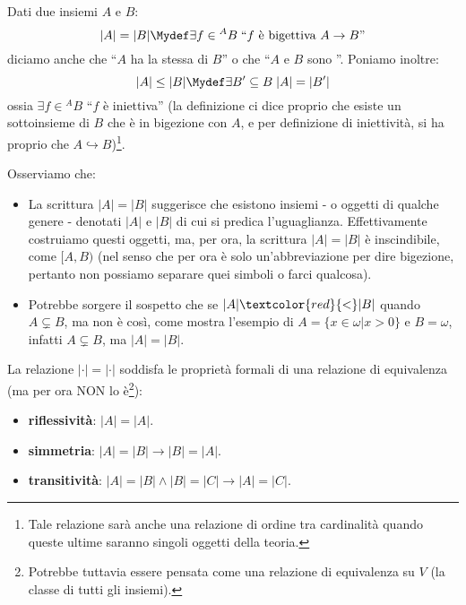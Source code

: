\documentclass[11pt]{scrartcl}
\begin{document}
\begin{definition}
	Dati due insiemi $A$ e $B$:
	\[ |A| = |B| \Mydef \exists f \in {}^A B \; \text{``$f$ è bigettiva $A \rightarrow B$''}
		\]
	diciamo anche che ``$A$ ha la stessa  di $B$'' o che ``$A$ e $B$ sono ''. Poniamo inoltre:
	\[ |A| \leq |B| \Mydef \exists B' \subseteq B \; |A| = |B'| 
		\]
	ossia $\exists f \in {}^A B$ ``$f$ è iniettiva'' (la definizione ci dice proprio che esiste un sottoinsieme di $B$ che è in bigezione con $A$, e per definizione di iniettività, si ha proprio che $A \hookrightarrow B$)\footnote{Tale relazione sarà anche una relazione di ordine tra cardinalità quando queste ultime saranno singoli oggetti della teoria.}.
\end{definition}

\begin{note}
	Osserviamo che:
	\begin{itemize}
		\item La scrittura $|A| = |B|$ suggerisce che esistono insiemi - o oggetti di qualche genere - denotati $|A|$ e $|B|$ di cui si predica l'uguaglianza.
		Effettivamente costruiamo questi oggetti, ma, per ora, la scrittura $|A| = |B|$ è inscindibile, come $[A,B)$ (nel senso che per ora è solo un'abbreviazione per dire bigezione, pertanto non possiamo separare quei simboli o farci qualcosa).
		\item Potrebbe sorgere il sospetto che se $|A|\textcolor{red}{<}|B|$ quando $A \subsetneq B$, ma non è così, come mostra l'esempio di $A = \{x \in \omega | x > 0\}$ e $B = \omega$, infatti $A \subsetneq B$, ma $|A| = |B|$.
	\end{itemize}
\end{note}

\begin{remark}
	La relazione $|\cdot| = |\cdot|$ soddisfa le proprietà formali di una relazione di equivalenza (ma per ora NON lo è\footnote{Potrebbe tuttavia essere pensata come una relazione di equivalenza su $V$ (la classe di tutti gli insiemi).}):
	\begin{itemize}
		\item \textbf{riflessività}: $|A| = |A|$.
		\item \textbf{simmetria}: $|A| = |B| \rightarrow |B| = |A|$.
		\item \textbf{transitività}: $|A| = |B| \land |B| = |C| \rightarrow |A| = |C|$.
	\end{itemize}
\end{remark}
\end{document}
